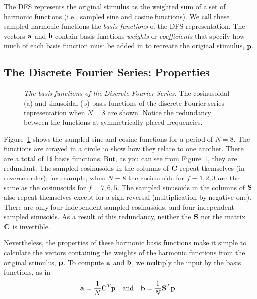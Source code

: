 The DFS represents the original stimulus as the weighted sum of a set
of harmonic functions (i.e., sampled sine and cosine functions).  We
call these sampled harmonic functions the {\em basis functions} of the
DFS representation. The vectors $\mbox{${\bf a}$}$ and $\mbox{${\bf b}$}$ contain
basis functions {\em weights} or {\em coefficients} that specify how
much of each basis function must be added in to recreate the original
stimulus, $\mbox {$\bf p$}$.

\subsection*{The Discrete Fourier Series:  Properties}
\begin{figure}
\centerline{
}
\caption[Cosinusoidal and Sinusoidal terms in the DFS]{
{\em The basis functions of the Discrete Fourier Series.}  The
cosinusoidal (a) and sinusoidal (b) basis functions of the discrete
Fourier series representation when $N=8$ are shown.  Notice the
redundancy between the functions at symmetrically placed frequencies.}
\label{f1a:sincos}
\end{figure}
Figure~\ref{f1a:sincos} shows the sampled sine and cosine functions
for a period of $N = 8$.  The functions are arrayed in a circle to
show how they relate to one another.  There are a total of 16 basis
functions.  But, as you can see from Figure~\ref{f1a:sincos}, they are
redundant.  The sampled cosinusoids in the columns of $\mbox{$ \bf C$}$ repeat
themselves (in reverse order); for example, when $N=8$ the cosinusoids
for $f = 1,2,3$ are the same as the cosinusoids for $f= 7,6,5$.  The
sampled sinusoids in the columns of $\mbox{$ \bf S$}$ also repeat themselves
except for a sign reversal (multiplication by negative one).  There
are only four independent sampled cosinusoids, and four independent
sampled sinusoids.  As a result of this redundancy, neither the
$\mbox{$ \bf S$}$ nor the matrix $\mbox{$ \bf C$}$ is invertible.

Nevertheless, the properties of these harmonic basis functions make it
simple to calculate the vectors containing the weights of the harmonic
functions from the original stimulus, $\mbox {$\bf p$}$.  To compute
$\mbox{${\bf a}$}$ and $\mbox{${\bf b}$}$, we multiply the input by the basis
functions, as in
\begin{equation}
\label{e1a:dfsCalcCoef}
\mbox{${\bf a}$} = \frac{1}{N} \mbox{$ \bf C$}^T \mbox {$\bf p$} 
~~~\mbox{and}~~~
\mbox{${\bf b}$} = \frac{1}{N} \mbox{$ \bf S$}^T \mbox {$\bf p$} .
\end{equation}

